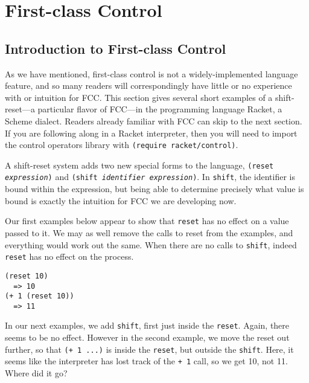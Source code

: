\documentclass[11pt]{article}
\newcommand{\maybePage}{\newpage}
\begin{document}
%


\maybePage
\section{First-class Control}
\label{sec:FCC}

\subsection{Introduction to First-class Control}
\label{subsec:intro-to-fcc}

As we have mentioned, first-class control is not a widely-implemented language feature, and so many readers will correspondingly have little or no experience with or intuition for FCC.
This section gives several short examples of a shift-reset---a particular flavor of FCC---in the programming language Racket, a Scheme dialect.
Readers already familiar with FCC can skip to the next section.
If you are following along in a Racket interpreter, then you will need to import the control operators library with \texttt{(require racket/control)}.

A shift-reset system adds two new special forms to the language, \texttt{(reset \textit{expression})} and \texttt{(shift \textit{identifier expression})}.
In \texttt{shift}, the identifier is bound within the expression, but being able to determine precisely what value is bound is exactly the intuition for FCC we are developing now.

Our first examples below appear to show that \texttt{reset} has no effect on a value passed to it.
We may as well remove the calls to reset from the examples, and everything would work out the same.
When there are no calls to \texttt{shift}, indeed \texttt{reset} has no effect on the process.

\begin{verbatim}
(reset 10)
  => 10
(+ 1 (reset 10))
  => 11
\end{verbatim}

In our next examples, we add \texttt{shift}, first just inside the \texttt{reset}.
Again, there seems to be no effect.
However in the second example, we move the reset out further, so that \texttt{(+ 1 ...)} is inside the \texttt{reset}, but outside the \texttt{shift}.
Here, it seems like the interpreter has lost track of the \texttt{+ 1} call, so we get 10, not 11.
Where did it go?
\end{document}
